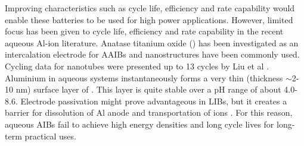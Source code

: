 Improving characteristics such as cycle life, efficiency and rate capability would enable these batteries to be used for high power applications. However, limited focus has been given to cycle life, efficiency and rate capability in the recent aqueous Al-ion literature. Anatase titanium oxide () has been investigated as an intercalation electrode for AAIBs and  nanostructures have been commonly used. Cycling data for  nanotubes were presented up to 13 cycles by Liu et al \cite{liu_aluminum_2012}.  %
Aluminium in aqueous systems instantaneously forms a very thin (thickness $\sim$2-10 nm) surface layer of  \cite{vargel_corrosion_2008}. This layer is quite stable over a pH range of about 4.0-8.6. Electrode passivation might prove advantageous in LIBs, but it creates a barrier for dissolution of Al anode and transportation of  ions \cite{myung_electrochemical_2011}. For this reason, aqueous AIBs fail to achieve high energy densities and long cycle lives for long-term practical uses.

